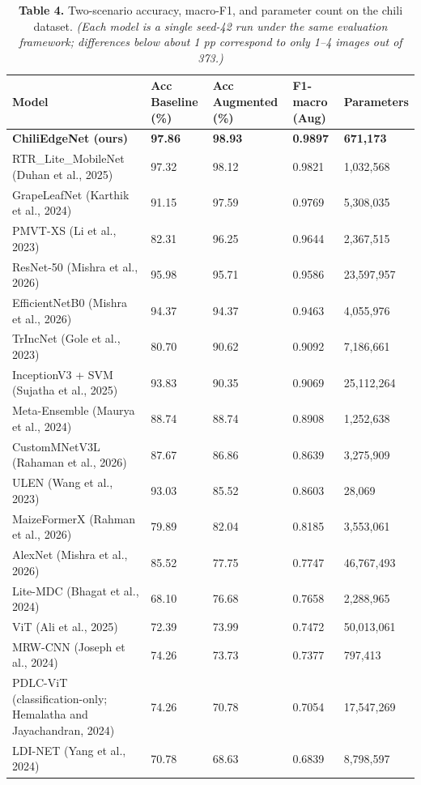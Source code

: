 \begin{table}[!tb]
\centering
\caption*{\textbf{Table 4.} Two-scenario accuracy, macro-F1, and parameter count on the chili dataset. \emph{(Each model is a single seed-42 run under the same evaluation framework; differences below about 1 pp correspond to only 1--4 images out of 373.)}}
\label{tab:4}
\footnotesize
\renewcommand{\arraystretch}{1.15}
\begin{tabular}{lllll}
\toprule
\textbf{Model} & \textbf{Acc Baseline (\%)} & \textbf{Acc Augmented (\%)} & \textbf{F1-macro (Aug)} & \textbf{Parameters} \\
\midrule
\textbf{ChiliEdgeNet (ours)} & \textbf{97.86} & \textbf{98.93} & \textbf{0.9897} & \textbf{671,173} \\
RTR\_Lite\_MobileNet (Duhan et al., 2025) & 97.32 & 98.12 & 0.9821 & 1,032,568 \\
GrapeLeafNet (Karthik et al., 2024) & 91.15 & 97.59 & 0.9769 & 5,308,035 \\
PMVT-XS (Li et al., 2023) & 82.31 & 96.25 & 0.9644 & 2,367,515 \\
ResNet-50 (Mishra et al., 2026) & 95.98 & 95.71 & 0.9586 & 23,597,957 \\
EfficientNetB0 (Mishra et al., 2026) & 94.37 & 94.37 & 0.9463 & 4,055,976 \\
TrIncNet (Gole et al., 2023) & 80.70 & 90.62 & 0.9092 & 7,186,661 \\
InceptionV3 + SVM (Sujatha et al., 2025) & 93.83 & 90.35 & 0.9069 & 25,112,264 \\
Meta-Ensemble (Maurya et al., 2024) & 88.74 & 88.74 & 0.8908 & 1,252,638 \\
CustomMNetV3L (Rahaman et al., 2026) & 87.67 & 86.86 & 0.8639 & 3,275,909 \\
ULEN (Wang et al., 2023) & 93.03 & 85.52 & 0.8603 & 28,069 \\
MaizeFormerX (Rahman et al., 2026) & 79.89 & 82.04 & 0.8185 & 3,553,061 \\
AlexNet (Mishra et al., 2026) & 85.52 & 77.75 & 0.7747 & 46,767,493 \\
Lite-MDC (Bhagat et al., 2024) & 68.10 & 76.68 & 0.7658 & 2,288,965 \\
ViT (Ali et al., 2025) & 72.39 & 73.99 & 0.7472 & 50,013,061 \\
MRW-CNN (Joseph et al., 2024) & 74.26 & 73.73 & 0.7377 & 797,413 \\
PDLC-ViT (classification-only; Hemalatha and Jayachandran, 2024) & 74.26 & 70.78 & 0.7054 & 17,547,269 \\
LDI-NET (Yang et al., 2024) & 70.78 & 68.63 & 0.6839 & 8,798,597 \\
\bottomrule
\end{tabular}
\end{table}

